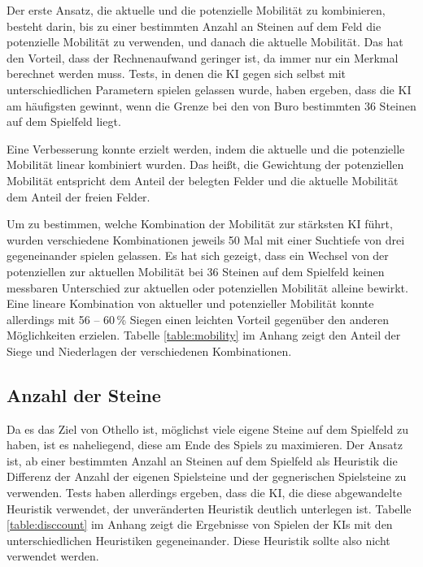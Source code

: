 Der erste Ansatz, die aktuelle und die potenzielle Mobilität zu kombinieren, besteht darin, bis zu einer bestimmten
Anzahl an Steinen auf dem Feld die potenzielle Mobilität zu verwenden, und danach die aktuelle Mobilität. Das hat den
Vorteil, dass der Rechnenaufwand geringer ist, da immer nur ein Merkmal berechnet werden muss. Tests, in denen die KI
gegen sich selbst mit unterschiedlichen Parametern spielen gelassen wurde, haben ergeben, dass die KI am häufigsten
gewinnt, wenn die Grenze bei den von Buro bestimmten 36 Steinen auf dem Spielfeld liegt.

Eine Verbesserung konnte erzielt werden, indem die aktuelle und die potenzielle Mobilität linear kombiniert wurden.
Das heißt, die Gewichtung der potenziellen Mobilität entspricht dem Anteil der belegten Felder und die aktuelle Mobilität
dem Anteil der freien Felder.

Um zu bestimmen, welche Kombination der Mobilität zur stärksten KI führt, wurden verschiedene Kombinationen jeweils 50
Mal mit einer Suchtiefe von drei gegeneinander spielen gelassen. Es hat sich gezeigt, dass ein Wechsel von der
potenziellen zur aktuellen Mobilität bei 36 Steinen auf dem Spielfeld keinen messbaren Unterschied zur aktuellen oder
potenziellen Mobilität alleine bewirkt. Eine lineare Kombination von aktueller und potenzieller Mobilität konnte
allerdings mit 56 – 60\,\% Siegen einen leichten Vorteil gegenüber den anderen Möglichkeiten erzielen. Tabelle
\ref{table:mobility} im Anhang zeigt den Anteil der Siege und Niederlagen der verschiedenen Kombinationen.

\subsection{Anzahl der Steine}
Da es das Ziel von Othello ist, möglichst viele eigene Steine auf dem Spielfeld zu haben, ist es naheliegend, diese am
Ende des Spiels zu maximieren. Der Ansatz ist, ab einer bestimmten Anzahl an Steinen auf dem Spielfeld als Heuristik die
Differenz der Anzahl der eigenen Spielsteine und der gegnerischen Spielsteine zu verwenden. Tests haben allerdings
ergeben, dass die KI, die diese abgewandelte Heuristik verwendet, der unveränderten Heuristik deutlich unterlegen ist.
Tabelle \ref{table:disccount} im Anhang zeigt die Ergebnisse von Spielen der KIs mit den unterschiedlichen Heuristiken
gegeneinander. Diese Heuristik sollte also nicht verwendet werden.
